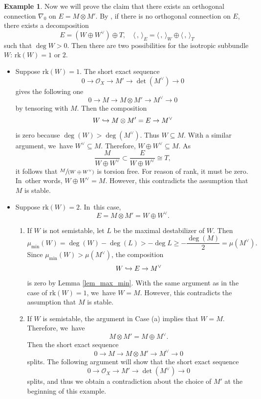 \documentclass[11pt]{article}
\numberwithin{equation}{section}
\newcommand\hto{\mathrel{\lhook\joinrel\to}}
\newcommand{\spfrac}[2]{\sfrac{#1}{(#2)}}
\newcommand{\rk}{\mathrm{rk}}
\theoremstyle{plain}
\theoremstyle{definition}
\newtheorem{examp}[thm]{Example}
\begin{document}
\begin{examp}
Now we will prove the claim that there exists an orthogonal connection $\nabla_0$ on $E = M \otimes M'$. By \cite[Th.\,4.2]{BMW11}, if there is no orthogonal connection on $E$, there exists a decomposition
\[
E= (W \oplus W^{\vee}) \oplus T, \quad \langle \,, \, \rangle_E = \langle \,, \, \rangle_W \oplus \langle \,, \, \rangle_T
\]
such that $\deg W > 0$. Then there are two possibilities for the isotropic subbundle $W$: $\rk(W)=1 \text{ or } 2$.
\begin{itemize}
\item Suppose $\rk(W)=1$. The short exact sequence
\[
0 \to \mathcal{O}_X \to M' \to \det(M^{\vee}) \to 0
\]
gives the following one
\[
0 \to M \to M \otimes M' \to M^{\vee} \to 0
\]
by tensoring with $M$. Then the composition
\[
W \hto M \otimes M' = E \to M^{\vee}
\]
is zero because $\deg(W) > \deg(M^{\vee})$. Thus $W \subseteq M$. With a similar argument, we~have $W^{\vee} \subseteq M$. Therefore, $W \oplus W^{\vee} \subseteq M$. As
\[
\frac{M}{W\oplus W^{\vee}} \subset \frac{E}{W\oplus W^{\vee}}\cong T,
\]
it follows that $ \spfrac{M}{W\oplus W^{\vee}}$ is torsion free. For reason of rank, it must be zero. In~other words, $W \oplus W^{\vee} = M$. However, this contradicts the assumption that $M$ is stable.

\item Suppose $\rk(W)=2$. In~this case,
\[
E = M \otimes M' = W \oplus W^\vee.
\]

\begin{enumerate}
\item[(a)] If $W$ is not semistable, let $L$ be the maximal destabilizer of $W$. Then
\[
\mu_{\min}(W) = \deg(W) - \deg(L) > - \deg L \geq - \frac{\deg(M)}{2} = \mu(M^{\vee}).
\]
Since $\mu_{\min}(W) > \mu(M^{\vee})$, the composition
\[
W \hto E \to M^{\vee}
\]
is zero by Lemma \ref{lem_max_min}. With the same argument as in the case of $\rk(W)=1$, we~have $W=M$. However, this contradicts the assumption that $M$ is stable.

\item[(b)] If $W$ is semistable, the argument in Case (a) implies that $W=M$. Therefore, we~have
\[
M \otimes M' = M \oplus M^{\vee}.
\]
Then the short exact sequence
\[
0 \to M \to M \otimes M' \to M^{\vee} \to 0
\]
splits. The following argument will show that the short exact sequence
\[
0 \to \mathcal{O}_X \to M' \to \det(M^{\vee}) \to 0
\]
splits, and thus we obtain a contradiction about the choice of $M'$ at the beginning of this example.


\end{enumerate}
\end{itemize}
\end{examp}
\end{document}
